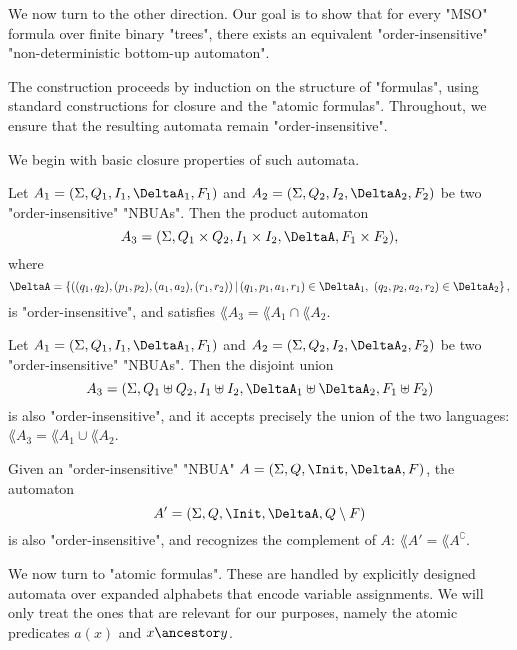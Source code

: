 \documentclass[a4paper,UKenglish,cleveref, autoref, thm-restate]{lipics-v2021}
\begin{document}
We now turn to the other direction. Our goal is to show that for every "MSO" formula over finite binary "trees",
there exists an equivalent "order-insensitive" "non-deterministic bottom-up automaton".

The construction proceeds by induction on the structure of "formulas", using standard constructions for closure and the "atomic formulas".
Throughout, we ensure that the resulting automata remain "order-insensitive".

We begin with basic closure properties of such automata.

\begin{lemma}[Intersection]\label{lem:intersection}
	Let $A_1 = (\Sigma, Q_1, I_1, \DeltaA_1, F_1)$ and $A_2 = (\Sigma, Q_2, I_2, \DeltaA_2, F_2)$ be two "order-insensitive" "NBUAs". Then the product automaton
	\[
		A_3 = (\Sigma, Q_1 \times Q_2, I_1 \times I_2, \DeltaA, F_1 \times F_2),
	\]
	where
	\[
		\DeltaA = \left\{ ((q_1,q_2), (p_1,p_2), (a_1,a_2), (r_1,r_2)) \,\middle|\, (q_1,p_1,a_1,r_1) \in \DeltaA_1,\ (q_2,p_2,a_2,r_2) \in \DeltaA_2 \right\},
	\]
	is "order-insensitive", and satisfies $\lang{A_3} = \lang{A_1} \cap \lang{A_2}$.
\end{lemma}

\begin{lemma}[Union]\label{lem:union}
	Let $A_1 = (\Sigma, Q_1, I_1, \DeltaA_1, F_1)$ and $A_2 = (\Sigma, Q_2, I_2, \DeltaA_2, F_2)$ be two "order-insensitive" "NBUAs". Then the disjoint union
	\[
		A_3 = (\Sigma, Q_1 \uplus Q_2, I_1 \uplus I_2, \DeltaA_1 \uplus \DeltaA_2, F_1 \uplus F_2)
	\]
	is also "order-insensitive", and it accepts precisely the union of the two languages: $\lang{A_3} = \lang{A_1} \cup \lang{A_2}$.
\end{lemma}

\begin{lemma}[Complement]\label{lem:complement}
	Given an "order-insensitive" "NBUA" $A = (\Sigma, Q, \Init, \DeltaA, F)$, the automaton
	\[
		A' = (\Sigma, Q, \Init, \DeltaA, Q \setminus F)
	\]
	is also "order-insensitive", and recognizes the complement of $A$: $\lang{A'} = \lang{A}^\complement$.
\end{lemma}

We now turn to "atomic formulas". These are handled by explicitly designed automata over expanded alphabets that encode variable assignments.
We will only treat the ones that are relevant for our purposes, namely the atomic predicates $a(x)$ and $x \ancestor y$.

\end{document}
